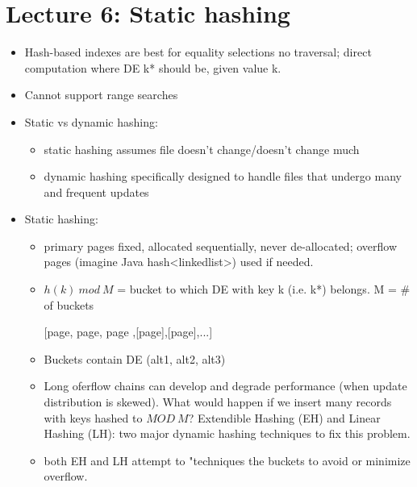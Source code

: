 \documentclass{article}
\begin{document}
\section{Lecture 6: Static hashing}
\begin{itemize}
    \item Hash-based indexes are best for equality selections
        \subitem no traversal; direct computation where DE k* should be, given value k.
    \item Cannot support range searches
    \item Static vs dynamic hashing:
    \begin{itemize}
        \item static hashing assumes file doesn't change/doesn't change much
        \item dynamic hashing specifically designed to handle files that undergo many and frequent updates
    \end{itemize}
    \item Static hashing:
    \begin{itemize}
        \item primary pages fixed, allocated sequentially, never de-allocated; overflow pages (imagine Java hash<linkedlist>) used if needed.
        \item $h(k)\ mod\ M$ = bucket to which DE with key k (i.e. k*) belongs. M = \# of buckets
        \item [[page, page, page],[page],[page],...]
        \item Buckets contain DE (alt1, alt2, alt3)
        \item Long oferflow chains can develop and degrade performance (when update distribution is skewed). What would happen if we insert many records with keys hashed to $MOD\ M$?
            \subitem Extendible Hashing (EH) and Linear Hashing (LH): two major dynamic hashing techniques to fix this problem.
        \item both EH and LH attempt to "techniques the buckets to avoid or minimize overflow.
    \end{itemize}
\end{itemize}
\end{document}
